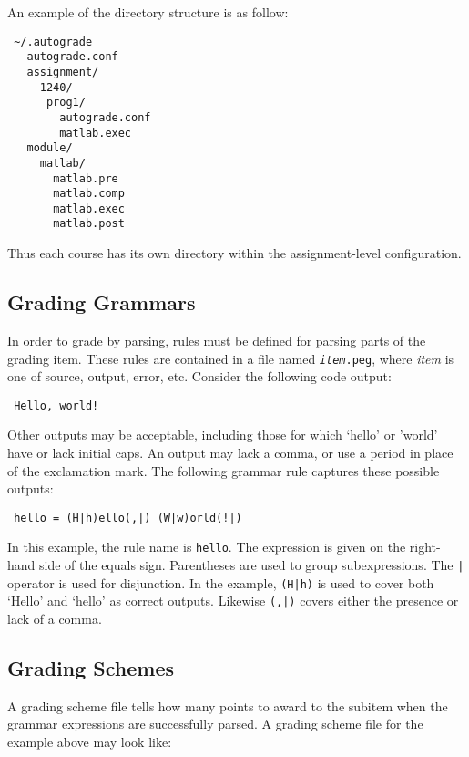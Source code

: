 \documentclass{article}
\begin{document}
An example of the directory structure is as follow:

\begin{verbatim}
 ~/.autograde
   autograde.conf
   assignment/
     1240/
      prog1/
        autograde.conf
        matlab.exec   
   module/
     matlab/    
       matlab.pre
       matlab.comp
       matlab.exec
       matlab.post
\end{verbatim}

Thus each course has its own directory within the assignment-level configuration.


\subsection{Grading Grammars}

In order to grade by parsing, rules must be defined for parsing parts of the
grading item. These rules are contained in a file named
\texttt{\emph{item}.peg}, where \emph{item} is one of source, output, error,
etc.  Consider the following code output:

\begin{verbatim}
 Hello, world! 
\end{verbatim}

Other outputs may be acceptable, including those for which `hello' or 'world'
have or lack initial caps. An output may lack a comma, or use a period in place
of the exclamation mark. The following grammar rule captures these possible
outputs:

\begin{verbatim}
 hello = (H|h)ello(,|) (W|w)orld(!|)
\end{verbatim}

In this example, the rule name is \texttt{hello}.  The expression is given on
the right-hand side of the equals sign.  Parentheses are used to group
subexpressions.  The \texttt{|} operator is used for disjunction.  In the
example, \texttt{(H|h)} is used to cover both `Hello' and `hello' as correct
outputs. Likewise \texttt{(,|)} covers either the presence or lack of a comma.

\subsection{Grading Schemes}

A grading scheme file tells how many points to award to the subitem when 
the grammar expressions are successfully parsed. A grading scheme file
for the example above may look like:
\end{document}
